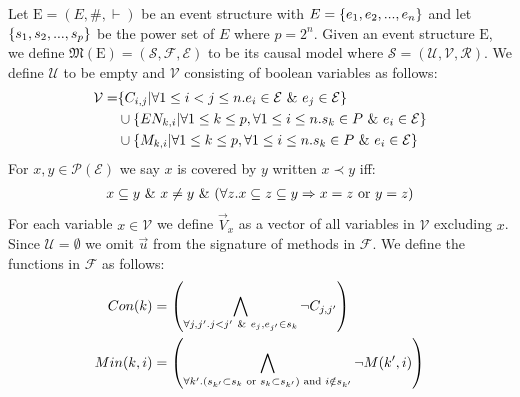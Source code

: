 Let $\mathrm{E} = (E,\#,\vdash)$ be an event structure with
$E = \{e_1, e_2, ...,e_n\}$ and let $\{s_1,s_2,...,s_p\}$ be the power set of $E$ where $p = 2^n$.
Given an event structure $\mathrm{E}$, we define
$\mathfrak{M}(\mathrm{E}) = (\mathcal{S},\mathcal{F},\mathcal{E})$
to be its causal model where
$\mathcal{S} = (\mathcal{U},\mathcal{V},\mathcal{R})$.
We define $\mathcal{U}$ to be empty and $\mathcal{V}$ consisting
of boolean variables as follows:
\begin{align*}
    \mathcal{V} = & \{C_{i,j} | \forall 1 \leq i < j \leq n. e_i \in \mathcal{E} \ \& \  e_j \in \mathcal{E}\}                     \\
                  & \cup \{EN_{k,i} | \forall 1 \leq k \leq p , \forall 1 \leq i \leq n . s_k \in P \ \& \  e_i \in \mathcal{E} \} \\
                  & \cup \{M_{k,i} | \forall 1 \leq k \leq p , \forall 1 \leq i \leq n . s_k \in P \ \& \  e_i \in \mathcal{E} \}
\end{align*}
For $x,y \in \mathcal{P}(\mathcal{E})$ we say $x$ is covered by $y$ written $ x \prec y$ iff:
\begin{align*}
    x \subseteq y \ \& \  x \neq y \ \& \ 
    (\forall z. x \subseteq z \subseteq y \Rightarrow x = z
    \text{ or } y = z)
\end{align*}
For each variable $x \in \mathcal{V}$ we define $\vec V_x$ as a vector
of all variables in $\mathcal{V}$ excluding $x$.
Since $\mathcal{U} = \emptyset$ we omit $\vec u$ from the
signature of methods in $\mathcal{F}$.
We define the functions in $\mathcal{F}$ as follows:
\begin{align*}
    Con(k) & =   \left(
    \bigwedge_{\forall j,j'. j<j' \ \& \  e_j,e_{j'} \in s_k}
    \neg C_{j,j'}
    \right)             \\
    Min(k,i) & = \left(
        \bigwedge_{\forall k'. (s_{k'} \subset s_k \text{ or } s_k \subset s_{k'}) 
        \text{ and } i \notin s_{k'}}
        \neg M(k',i)
    \right)
\end{align*}
